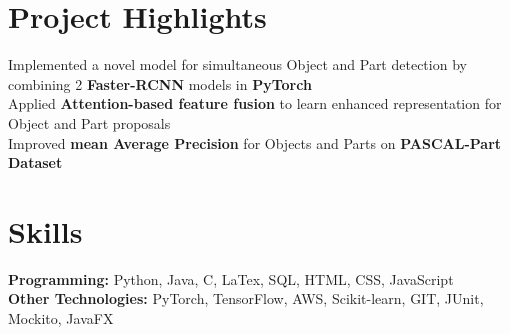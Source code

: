 \documentclass[]{Keval-resume}
\begin{document}
\section{Project Highlights}
\hrulefill
\postsectionsep




\textbullet{} Implemented a novel model for simultaneous Object and Part detection by combining 2 \textbf{Faster-RCNN} models in \textbf{PyTorch} \\
\textbullet{} Applied \textbf{Attention-based feature fusion} to learn enhanced representation for Object and Part proposals \\
\textbullet{} Improved \textbf{mean Average Precision} for Objects and Parts on \textbf{PASCAL-Part Dataset}
\sectionsep

\section{Skills} 
\hrulefill
\postsectionsep

\textbullet{} \textbf{Programming:} Python, Java, C, LaTex, SQL, HTML, CSS, JavaScript \\
\textbullet{} \textbf{Other Technologies:} PyTorch, TensorFlow, AWS, Scikit-learn, GIT, JUnit, Mockito, JavaFX

\sectionsep
\end{document}
